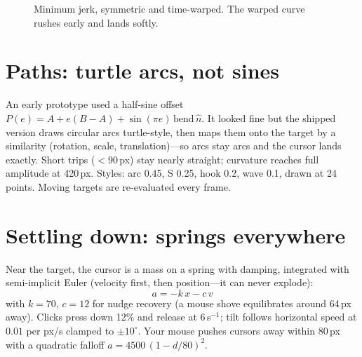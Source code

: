 \documentclass[10pt,conference]{IEEEtran}
\begin{document}
\begin{figure}[h]
\centering
{}
\caption{Minimum jerk, symmetric and time-warped. The warped curve rushes
early and lands softly.}
\label{fig:jerk}
\end{figure}

\section{Paths: turtle arcs, not sines}
An early prototype used a half-sine offset $P(e) = A + e(B-A) + \sin(\pi
e)\,\mathrm{bend}\,\hat{n}$. It looked fine but the shipped version draws
circular arcs turtle-style, then maps them onto the target by a similarity
(rotation, scale, translation)---so arcs stay arcs and the cursor lands
exactly. Short trips ($<90$\,px) stay nearly straight; curvature reaches full
amplitude at 420\,px. Styles: arc 0.45, S 0.25, hook 0.2, wave 0.1, drawn at
24 points. Moving targets are re-evaluated every frame.

\section{Settling down: springs everywhere}
Near the target, the cursor is a mass on a spring with damping, integrated
with semi-implicit Euler (velocity first, then position---it can never
explode):
\begin{equation}
a = -k\,x - c\,v
\end{equation}
with $k=70$, $c=12$ for nudge recovery (a mouse shove equilibrates around
64\,px away). Clicks press down 12\% and release at 6\,s$^{-1}$; tilt follows
horizontal speed at $0.01$ per px/s clamped to $\pm10^{\circ}$. Your mouse
pushes cursors away within 80\,px with a quadratic falloff
$a = 4500\,(1-d/80)^2$.
\end{document}
